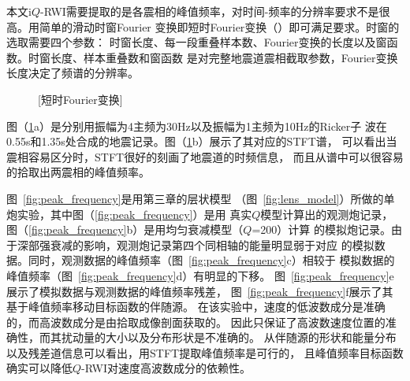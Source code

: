本文i$Q$-RWI需要提取的是各震相的峰值频率，对时间-频率的分辨率要求不是很高。用简单的滑动时窗Fourier
变换即短时Fourier变换（）即可满足要求。时窗的选取需要四个参数：
时窗长度、每一段重叠样本数、Fourier变换的长度以及窗函数。时窗长度、样本重叠数和窗函数
是对完整地震道震相截取参数，Fourier变换长度决定了频谱的分辨率。

\begin{figure}[!htbp]
    \centering
    [短时Fourier变换]
    \label{fig:stft_effect}
\end{figure}
图（\ref{fig:stft_effect}a）是分别用振幅为4主频为30Hz以及振幅为1主频为10Hz的Ricker子
波在0.55s和1.35s处合成的地震记录。图（\ref{fig:stft_effect}b）展示了其对应的STFT谱，
可以看出当震相容易区分时，STFT很好的刻画了地震道的时频信息，
而且从谱中可以很容易的拾取出两震相的峰值频率。

图~\ref{fig:peak_frequency}是用第三章的层状模型
（图~\ref{fig:lens_model}）所做的单炮实验，其中图（\ref{fig:peak_frequency}）是用
真实$Q$模型计算出的观测炮记录，图（\ref{fig:peak_frequency}b）是用均匀衰减模型（$Q$=200）计算
的模拟炮记录。由于深部强衰减的影响，观测炮记录第四个同相轴的能量明显弱于对应
的模拟数据。同时，观测数据的峰值频率（图~\ref{fig:peak_frequency}c）相较于
模拟数据的峰值频率（图~\ref{fig:peak_frequency}d）有明显的下移。
图~\ref{fig:peak_frequency}e展示了模拟数据与观测数据的峰值频率残差，
图~\ref{fig:peak_frequency}f展示了其基于峰值频率移动目标函数的伴随源。
在该实验中，速度的低波数成分是准确的，而高波数成分是由拾取成像剖面获取的。
因此只保证了高波数速度位置的准确性，而其扰动量的大小以及分布形状是不准确的。
从伴随源的形状和能量分布以及残差道信息可以看出，用STFT提取峰值频率是可行的，
且峰值频率目标函数确实可以降低$Q$-RWI对速度高波数成分的依赖性。


